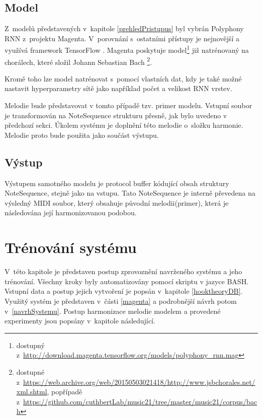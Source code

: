 \section{Model}
Z~modelů představených v~kapitole \ref{prehledPristupus} byl vybrán 
Polyphony RNN z~projektu Magenta.
V~porovnání s~ostatními přístupy je nejnovější a využívá framework TensorFlow
\cite{YinCheng_comparativeStudy,google_git_polyphony}.
Magenta poskytuje model\footnote{dostupný z~\url{http://download.magenta.tensorflow.org/models/polyphony_rnn.mag}} 
již natrénovaný na chorálech, které složil Johann Sebastian Bach
\footnote{
dostupné z~\url{https://web.archive.org/web/20150503021418/http://www.jsbchorales.net/xml.shtml}, 
popřípadě z~\url{https://github.com/cuthbertLab/music21/tree/master/music21/corpus/bach}}.

Kromě toho lze model natrénovat s~pomocí vlastních dat,
kdy je také možné nastavit hyperparametry sítě jako například počet a velikost RNN vrstev.
\cite{google_git_polyphony}
\par

Melodie bude představovat v tomto případě tzv. primer modelu.
Vstupní soubor je transformován na NoteSequence strukturu
přesně, jak bylo uvedeno v předchozí sekci.
Úkolem systému je doplnění této melodie o~složku harmonie. 
Melodie proto bude použita jako součást výstupu.

\section{Výstup}
Výstupem samotného modelu je protocol buffer 
kódující obsah struktury NoteSequence, 
stejně jako na vstupu.
Tato NoteSequence je interně převedena na výsledný MIDI soubor, 
který obsahuje původní melodii(primer), která je následována její harmonizovanou podobou.
\cite{google_git_polyphony}

\chapter{Trénování systému}
\label{trenovaniModelu}
V~této kapitole je představen postup zprovoznění navrženého systému a jeho trénování.
Všechny kroky byly automatizovány pomocí skriptu v jazyce BASH.
Vstupní data a postup jejich vytvoření je popsán v~kapitole \ref{hooktheoryDB}.
Využitý systém je představen v~části \ref{magenta} 
a podrobnější návrh potom v~\ref{navrhSystemu}.
Postup harmonizace melodie modelem a provedené experimenty jsou popsány v~kapitole následující.
\par

